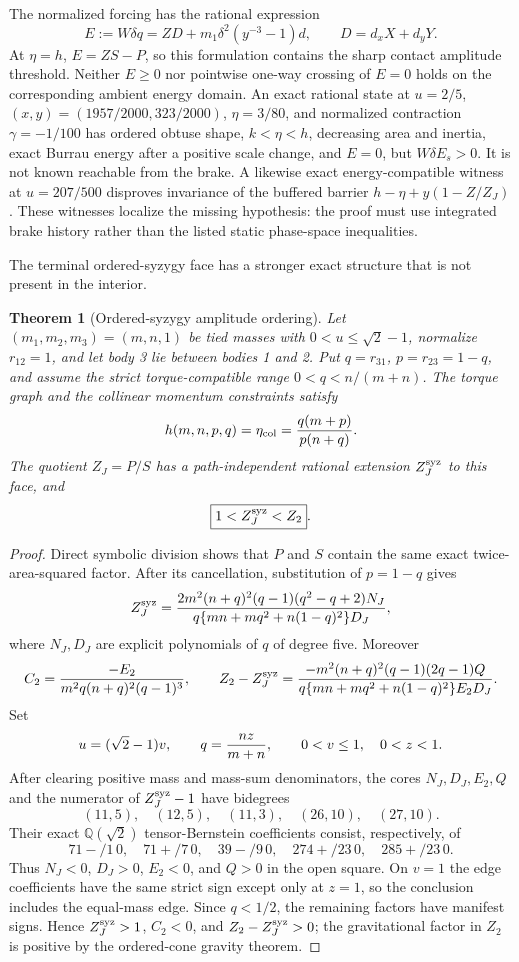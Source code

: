 \documentclass[11pt]{article}
\newtheorem{theorem}{Theorem}
\begin{document}
The normalized forcing has the rational expression
\[
 E:=W\delta q=ZD+m_1\delta^2(y^{-3}-1)d,\qquad
 D=d_xX+d_yY.
\]
At $\eta=h$, $E=ZS-P$, so this formulation contains the sharp contact
amplitude threshold.  Neither $E\ge0$ nor pointwise one-way crossing of
$E=0$ holds on the corresponding ambient energy domain.  An exact rational
state at $u=2/5$, $(x,y)=(1957/2000,323/2000)$,
$\eta=3/80$, and normalized contraction $\gamma=-1/100$ has ordered obtuse
shape, $k<\eta<h$, decreasing area and inertia, exact Burrau energy after a
positive scale change, and $E=0$, but $W\delta E_s>0$.  It is not known
reachable from the brake.  A likewise exact energy-compatible witness at
$u=207/500$ disproves invariance of the buffered barrier
$h-\eta+y(1-Z/Z_J)$.  These witnesses localize the missing hypothesis:
the proof must use integrated brake history rather than the listed static
phase-space inequalities.

The terminal ordered-syzygy face has a stronger exact structure that is not
present in the interior.

\begin{theorem}[Ordered-syzygy amplitude ordering]
Let $(m_1,m_2,m_3)=(m,n,1)$ be tied masses with
$0<u\le\sqrt2-1$, normalize $r_{12}=1$, and let body 3 lie between bodies 1
and 2.  Put $q=r_{31}$, $p=r_{23}=1-q$, and assume the strict torque-compatible
range $0<q<n/(m+n)$.  The torque graph and the collinear momentum constraints
satisfy
\[
 h(m,n,p,q)=\eta_{\rm col}={q(m+p)\over p(n+q)}.
\]
The quotient $Z_J=P/S$ has a path-independent rational extension
$Z_J^{\rm syz}$ to this face, and
\[
 \boxed{1<Z_J^{\rm syz}<Z_2}.
\]
\end{theorem}

\begin{proof}
Direct symbolic division shows that $P$ and $S$ contain the same exact
twice-area-squared factor.  After its cancellation, substitution of $p=1-q$
gives
\[
 Z_J^{\rm syz}=
 {2m^2(n+q)^2(q-1)(q^2-q+2)N_J
  \over q\{mn+mq^2+n(1-q)^2\}D_J},
\]
where $N_J,D_J$ are explicit polynomials of $q$ of degree five.  Moreover
\[
 C_2={-E_2\over m^2q(n+q)^2(q-1)^3},\qquad
 Z_2-Z_J^{\rm syz}=
 {-m^2(n+q)^2(q-1)(2q-1)Q\over
 q\{mn+mq^2+n(1-q)^2\}E_2D_J}.
\]
Set
\[
 u=(\sqrt2-1)v,\qquad q={nz\over m+n},\qquad
 0<v\le1,\quad 0<z<1.
\]
After clearing positive mass and mass-sum denominators, the cores
$N_J,D_J,E_2,Q$ and the numerator of $Z_J^{\rm syz}-1$ have bidegrees
\[
 (11,5),\quad(12,5),\quad(11,3),\quad(26,10),\quad(27,10).
\]
Their exact $\mathbb Q(\sqrt2)$ tensor-Bernstein coefficients consist,
respectively, of
\[
 71-/1\,0,\quad71+/7\,0,\quad39-/9\,0,\quad274+/23\,0,
 \quad285+/23\,0.
\]
Thus $N_J<0$, $D_J>0$, $E_2<0$, and $Q>0$ in the open square.  On $v=1$
the edge coefficients have the same strict sign except only at $z=1$, so
the conclusion includes the equal-mass edge.  Since $q<1/2$, the remaining
factors have manifest signs.  Hence $Z_J^{\rm syz}>1$, $C_2<0$, and
$Z_2-Z_J^{\rm syz}>0$; the gravitational factor in $Z_2$ is positive by the
ordered-cone gravity theorem.
\end{proof}
\end{document}
